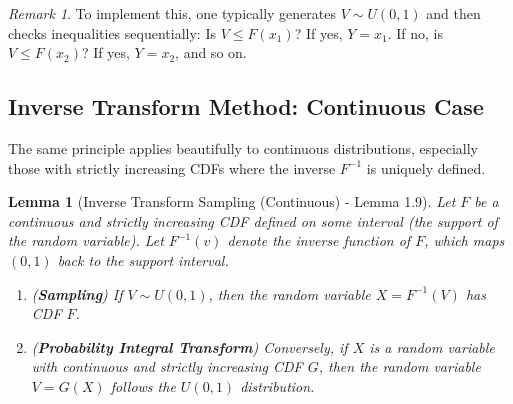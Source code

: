 \documentclass[11pt]{article}
\newtheorem{lemma}[theorem]{Lemma}
\theoremstyle{definition}
\theoremstyle{remark}
\newtheorem{remark}[theorem]{Remark}
\begin{document}
\begin{remark}
To implement this, one typically generates $V \sim U(0,1)$ and then checks inequalities sequentially: Is $V \le F(x_1)$? If yes, $Y=x_1$. If no, is $V \le F(x_2)$? If yes, $Y=x_2$, and so on.
\end{remark}

\subsection{Inverse Transform Method: Continuous Case}

The same principle applies beautifully to continuous distributions, especially those with strictly increasing CDFs where the inverse $F^{-1}$ is uniquely defined.

\begin{lemma}[Inverse Transform Sampling (Continuous) - Lemma 1.9]
Let $F$ be a continuous and strictly increasing CDF defined on some interval (the support of the random variable). Let $F^{-1}(v)$ denote the inverse function of $F$, which maps $(0, 1)$ back to the support interval.
\begin{enumerate}
    \item (\textbf{Sampling}) If $V \sim U(0, 1)$, then the random variable $X = F^{-1}(V)$ has CDF $F$.
    \item (\textbf{Probability Integral Transform}) Conversely, if $X$ is a random variable with continuous and strictly increasing CDF $G$, then the random variable $V = G(X)$ follows the $U(0, 1)$ distribution.
\end{enumerate}
\end{lemma}
\end{document}
